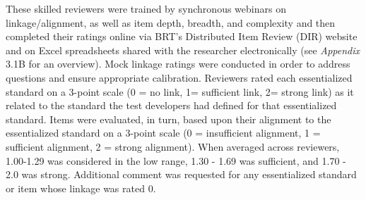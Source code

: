 \documentclass[]{article}
\begin{document}
These skilled reviewers were trained by synchronous webinars on
linkage/alignment, as well as item depth, breadth, and complexity and
then completed their ratings online via BRT's Distributed Item Review
(DIR) website and on Excel spreadsheets shared with the researcher
electronically (see \emph{Appendix} 3.1B for an overview). Mock linkage
ratings were conducted in order to address questions and ensure
appropriate calibration. Reviewers rated each essentialized standard on
a 3-point scale (0 = no link, 1= sufficient link, 2= strong link) as it
related to the standard the test developers had defined for that
essentialized standard. Items were evaluated, in turn, based upon their
alignment to the essentialized standard on a 3-point scale (0 =
insufficient alignment, 1 = sufficient alignment, 2 = strong alignment).
When averaged across reviewers, 1.00-1.29 was considered in the low
range, 1.30 - 1.69 was sufficient, and 1.70 - 2.0 was strong. Additional
comment was requested for any essentialized standard or item whose
linkage was rated 0.
\end{document}
